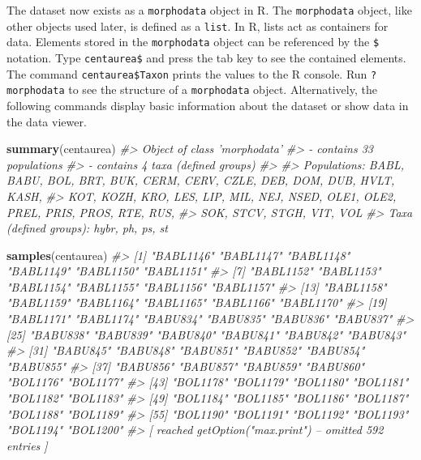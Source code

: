 \documentclass[
]{article}
\newenvironment{Shaded}{\begin{snugshade}}{\end{snugshade}}
\newcommand{\CommentTok}[1]{\textcolor[rgb]{0.56,0.35,0.01}{\textit{#1}}}
\newcommand{\KeywordTok}[1]{\textcolor[rgb]{0.13,0.29,0.53}{\textbf{#1}}}
\newcommand{\NormalTok}[1]{#1}
\begin{document}
The dataset now exists as a \texttt{morphodata} object in R. The
\texttt{morphodata} object, like other objects used later, is defined as
a \texttt{list}. In R, lists act as containers for data. Elements stored
in the \texttt{morphodata} object can be referenced by the \texttt{\$}
notation. Type \texttt{centaurea\$} and press the tab key to see the
contained elements. The command \texttt{centaurea\$Taxon} prints the
values to the R console. Run \texttt{?morphodata} to see the structure
of a \texttt{morphodata} object. Alternatively, the following commands
display basic information about the dataset or show data in the data
viewer.

\begin{Shaded}
\begin{Highlighting}[]
\KeywordTok{summary}\NormalTok{(centaurea)}
\CommentTok{#> Object of class 'morphodata'}
\CommentTok{#> - contains 33 populations}
\CommentTok{#> - contains 4 taxa (defined groups)}
\CommentTok{#> }
\CommentTok{#> Populations: BABL, BABU, BOL, BRT, BUK, CERM, CERV, CZLE, DEB, DOM, DUB, HVLT, KASH,}
\CommentTok{#>  KOT, KOZH, KRO, LES, LIP, MIL, NEJ, NSED, OLE1, OLE2, PREL, PRIS, PROS, RTE, RUS,}
\CommentTok{#>  SOK, STCV, STGH, VIT, VOL}
\CommentTok{#> Taxa (defined groups): hybr, ph, ps, st}
\end{Highlighting}
\end{Shaded}

\begin{Shaded}
\begin{Highlighting}[]
\KeywordTok{samples}\NormalTok{(centaurea)}
\CommentTok{#>  [1] "BABL1146" "BABL1147" "BABL1148" "BABL1149" "BABL1150" "BABL1151"}
\CommentTok{#>  [7] "BABL1152" "BABL1153" "BABL1154" "BABL1155" "BABL1156" "BABL1157"}
\CommentTok{#> [13] "BABL1158" "BABL1159" "BABL1164" "BABL1165" "BABL1166" "BABL1170"}
\CommentTok{#> [19] "BABL1171" "BABL1174" "BABU834"  "BABU835"  "BABU836"  "BABU837" }
\CommentTok{#> [25] "BABU838"  "BABU839"  "BABU840"  "BABU841"  "BABU842"  "BABU843" }
\CommentTok{#> [31] "BABU845"  "BABU848"  "BABU851"  "BABU852"  "BABU854"  "BABU855" }
\CommentTok{#> [37] "BABU856"  "BABU857"  "BABU859"  "BABU860"  "BOL1176"  "BOL1177" }
\CommentTok{#> [43] "BOL1178"  "BOL1179"  "BOL1180"  "BOL1181"  "BOL1182"  "BOL1183" }
\CommentTok{#> [49] "BOL1184"  "BOL1185"  "BOL1186"  "BOL1187"  "BOL1188"  "BOL1189" }
\CommentTok{#> [55] "BOL1190"  "BOL1191"  "BOL1192"  "BOL1193"  "BOL1194"  "BOL1200" }
\CommentTok{#>  [ reached getOption("max.print") -- omitted 592 entries ]}
\end{Highlighting}
\end{Shaded}
\end{document}
